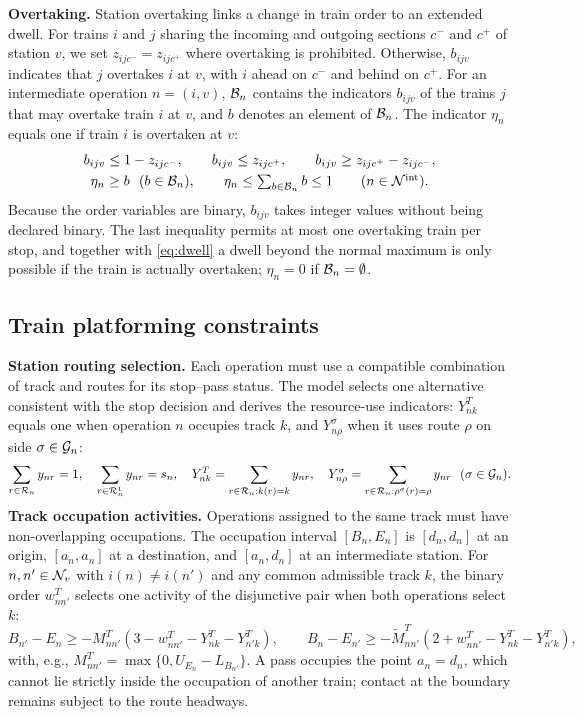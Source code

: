 \textbf{Overtaking.} Station overtaking links a change in train order to an extended dwell. For trains $i$ and $j$ sharing the incoming and outgoing sections $c^-$ and $c^+$ of station $v$, we set $z_{ijc^-}=z_{ijc^+}$ where overtaking is prohibited. Otherwise, $b_{ijv}$ indicates that $j$ overtakes $i$ at $v$, with $i$ ahead on $c^-$ and behind on $c^+$. For an intermediate operation $n=(i,v)$, $\mathcal{B}_n$ contains the indicators $b_{ijv}$ of the trains $j$ that may overtake train $i$ at $v$, and $b$ denotes an element of $\mathcal{B}_n$. The indicator $\eta_n$ equals one if train $i$ is overtaken at $v$:
\begin{equation}
\begin{gathered}
b_{ijv}\le1-z_{ijc^-},\qquad b_{ijv}\le z_{ijc^+},\qquad b_{ijv}\ge z_{ijc^+}-z_{ijc^-},\\
\eta_n\ge b\ \ (b\in\mathcal{B}_n),\qquad \eta_n\le\textstyle\sum_{b\in\mathcal{B}_n}b\le1\qquad(n\in\mathcal{N}^{\mathrm{int}}).
\end{gathered}\label{eq:overtake}
\end{equation}
Because the order variables are binary, $b_{ijv}$ takes integer values without being declared binary. The last inequality permits at most one overtaking train per stop, and together with \eqref{eq:dwell} a dwell beyond the normal maximum is only possible if the train is actually overtaken; $\eta_n=0$ if $\mathcal{B}_n=\emptyset$.

\subsection{Train platforming constraints}\label{sec:platforming}
\textbf{Station routing selection.} Each operation must use a compatible combination of track and routes for its stop--pass status. The model selects one alternative consistent with the stop decision and derives the resource-use indicators: $Y^T_{nk}$ equals one when operation $n$ occupies track $k$, and $Y^\sigma_{n\rho}$ when it uses route $\rho$ on side $\sigma\in\mathcal{G}_n$:
\begin{equation}
\sum_{r\in\Rset_n}y_{nr}=1,\quad\sum_{r\in\Rset^1_n}y_{nr}=s_n,\quad
Y^T_{nk}=\sum_{r\in\Rset_n:k(r)=k}y_{nr},\quad Y^\sigma_{n\rho}=\sum_{r\in\Rset_n:\rho^\sigma(r)=\rho}y_{nr}\ \ (\sigma\in\Gset_n).\label{eq:select}
\end{equation}
\textbf{Track occupation activities.} Operations assigned to the same track must have non-overlapping occupations. The occupation interval $[B_n,E_n]$ is $[d_n,d_n]$ at an origin, $[a_n,a_n]$ at a destination, and $[a_n,d_n]$ at an intermediate station. For $n,n'\in\mathcal{N}_v$ with $i(n)\ne i(n')$ and any common admissible track $k$, the binary order $w^T_{nn'}$ selects one activity of the disjunctive pair when both operations select $k$:
\begin{equation}
B_{n'}-E_n\ge-M^T_{nn'}(3-w^T_{nn'}-Y^T_{nk}-Y^T_{n'k}),\qquad
B_n-E_{n'}\ge-\tilde M^T_{nn'}(2+w^T_{nn'}-Y^T_{nk}-Y^T_{n'k}),\label{eq:track}
\end{equation}
with, e.g., $M^T_{nn'}=\max\{0,U_{E_n}-L_{B_{n'}}\}$. A pass occupies the point $a_n=d_n$, which cannot lie strictly inside the occupation of another train; contact at the boundary remains subject to the route headways.

